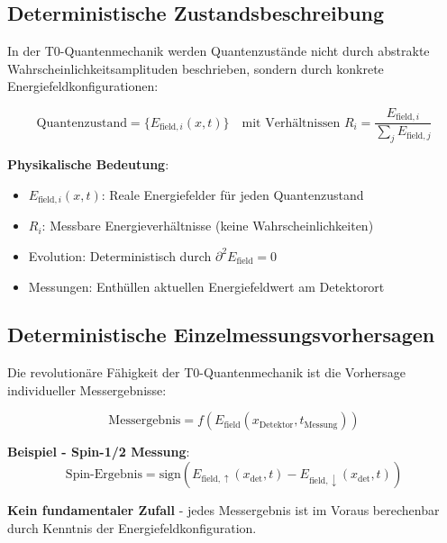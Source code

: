 \documentclass[12pt,a4paper]{article}
\theoremstyle{definition}
\theoremstyle{remark}
\begin{document}
\subsection{Deterministische Zustandsbeschreibung}

In der T0-Quantenmechanik werden Quantenzust{\"a}nde nicht durch abstrakte Wahrscheinlichkeitsamplituden beschrieben, sondern durch konkrete Energiefeldkonfigurationen:

\begin{equation}
	\boxed{\text{Quantenzustand} = \{E_{\text{field},i}(x,t)\} \quad \text{mit Verh{\"a}ltnissen } R_i = \frac{E_{\text{field},i}}{\sum_j E_{\text{field},j}}}
	\label{eq:deterministic_state}
\end{equation}

\textbf{Physikalische Bedeutung}:
\begin{itemize}
	\item $E_{\text{field},i}(x,t)$: Reale Energiefelder f{\"u}r jeden Quantenzustand
	\item $R_i$: Messbare Energieverh{\"a}ltnisse (keine Wahrscheinlichkeiten)
	\item Evolution: Deterministisch durch $\partial^2 E_{\text{field}} = 0$
	\item Messungen: Enth{\"u}llen aktuellen Energiefeldwert am Detektorort
\end{itemize}

\subsection{Deterministische Einzelmessungsvorhersagen}

Die revolution{\"a}re F{\"a}higkeit der T0-Quantenmechanik ist die Vorhersage individueller Messergebnisse:

\begin{equation}
	\boxed{\text{Messergebnis} = f\left(E_{\text{field}}(x_{\text{Detektor}}, t_{\text{Messung}})\right)}
	\label{eq:deterministic_measurement}
\end{equation}

\textbf{Beispiel - Spin-1/2 Messung}:
\begin{equation}
	\text{Spin-Ergebnis} = \text{sign}\left(E_{\text{field},\uparrow}(x_{\text{det}}, t) - E_{\text{field},\downarrow}(x_{\text{det}}, t)\right)
	\label{eq:spin_measurement}
\end{equation}

\textbf{Kein fundamentaler Zufall} - jedes Messergebnis ist im Voraus berechenbar durch Kenntnis der Energiefeldkonfiguration.
\end{document}
